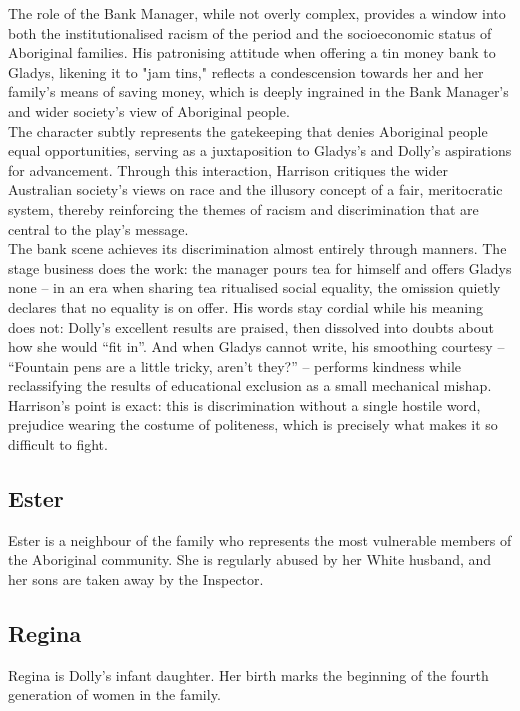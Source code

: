 \documentclass[a4paper]{article}
\begin{document}
The role of the Bank Manager, while not overly complex, provides a window into both the 
institutionalised racism of the period and the socioeconomic status of Aboriginal families. His 
patronising attitude when offering a tin money bank to Gladys, likening it to "jam tins," reflects 
a condescension towards her and her family's means of saving money, which is deeply ingrained in 
the Bank Manager’s and wider society’s view of Aboriginal people.\\

The character subtly represents the gatekeeping that denies Aboriginal people equal opportunities, 
serving as a juxtaposition to Gladys’s and Dolly's aspirations for advancement. Through  this 
interaction, Harrison critiques the wider Australian society's views on race and the illusory concept of a fair, meritocratic
system, thereby reinforcing the themes of racism and
discrimination that are central to the play's message.\\



The bank scene achieves its discrimination almost entirely through manners. The stage business does the work: the manager pours tea for himself and offers Gladys none -- in an era when sharing tea ritualised social equality, the omission quietly declares that no equality is on offer. His words stay cordial while his meaning does not: Dolly's excellent results are praised, then dissolved into doubts about how she would ``fit in''. And when Gladys cannot write, his smoothing courtesy -- ``Fountain pens are a little tricky, aren't they?'' -- performs kindness while reclassifying the results of educational exclusion as a small mechanical mishap. Harrison's point is exact: this is discrimination without a single hostile word, prejudice wearing the costume of politeness, which is precisely what makes it so difficult to fight.\\

\subsection{Ester}
Ester is a neighbour of the family who represents the
most vulnerable members of the Aboriginal community. She is regularly abused by her White husband, and her sons are taken
away by the Inspector.\\

\subsection{Regina}
Regina is Dolly’s infant daughter. Her birth marks the
beginning of the fourth generation of women in the family.\\
\end{document}

